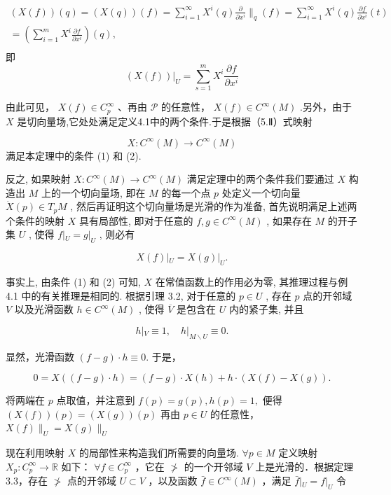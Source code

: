 $$
\begin{array}{l} (X (f)) (q) = (X (q)) (f) = \sum_ {i = 1} ^ {\infty} X ^ {i} (q) \frac {\partial}{\partial x ^ {i}} \Bigg \| _ {q} (f) = \sum_ {i = 1} ^ {\infty} X ^ {i} (q) \frac {\partial f}{\partial x ^ {i}} (t) \\ = \left(\sum_ {i = 1} ^ {m} X ^ {i} \frac {\partial f}{\partial x ^ {i}}\right) (q), \\ \end{array}
$$
即
$$
\left. (X (f)) \right| _ {U} = \sum_ {s = 1} ^ {m} X ^ {i} \frac {\partial f}{\partial x ^ {i}}
$$

由此可见，  $X(f)\in C_{p}^{\infty}$  、再由  $\mathcal{P}$  的任意性，  $X(f)\in C^{\infty}(M)$  .另外，由于 $X$  是切向量场,它处处满足定义4.1中的两个条件.于是根据（5.Ⅱ）式映射

$$
X: C ^ {\infty} (M) \to C ^ {\infty} (M)
$$
满足本定理中的条件 (1) 和 (2).

反之, 如果映射  $X: C^{\infty}(M) \to C^{\infty}(M)$  满足定理中的两个条件我们要通过  $X$  构造出  $M$  上的一个切向量场, 即在  $M$  的每一个点  $p$  处定义一个切向量  $\dot{X}(p) \in T_pM$ , 然后再证明这个切向量场是光滑的作为准备, 首先说明满足上述两个条件的映射  $X$  具有局部性, 即对于任意的  $f, g \in C^{\infty}(M)$ , 如果存在  $M$  的开子集  $U$ , 使得  $f|_U = g|_U$ , 则必有

$$
X (f) | _ {U} = X (g) | _ {U}.
$$

事实上, 由条件 (1) 和 (2) 可知,  $X$  在常值函数上的作用必为零, 其推理过程与例 4.1 中的有关推理是相同的. 根据引理 3.2, 对于任意的  $p \in U$ , 存在  $p$  点的开邻域  $V$  以及光滑函数  $h \in C^{\infty}(M)$ , 使得  $\overline{V}$  是包含在  $U$  内的紧子集, 并且

$$
h | _ {V} \equiv 1, \quad h | _ {M \backslash U} \equiv 0.
$$

显然，光滑函数  $(f - g)\cdot h\equiv 0.$  于是，

$$
0 = X ((f - g) \cdot h) = (f - g) \cdot X (h) + h \cdot (X (f) - X (g)).
$$

将两端在  $p$  点取值，并注意到  $f(p) = g(p), h(p) = 1,$  便得  $(X(f))(p) = (X(g))(p)$  再由  $p\in U$  的任意性，  $X(f)\|_{U} = X(g)\|_{U}$

现在利用映射  $X$  的局部性来构造我们所需要的向量场.  $\forall p\in M$  定义映射  $X_{p}:C_{p}^{\infty}\to \mathbb{R}$  如下：  $\forall f\in C_p^\infty$  ，它在  $\ngtr$  的一个开邻域  $V$  上是光滑的．根据定理3.3，存在  $\ngtr$  点的开邻域  $U\subset V$  ，以及函数 $\bar{f}\in C^{\infty}(M)$  ，满足  $\bar{f}|_{U} = f|_{U}$  令

